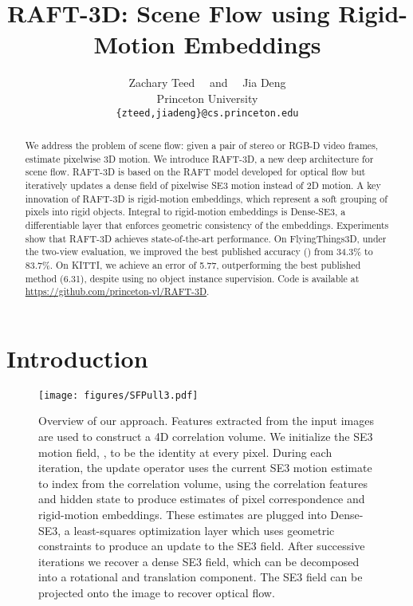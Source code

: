 \documentclass[final]{cvpr}
\begin{document}
\title{RAFT-3D: Scene Flow using Rigid-Motion Embeddings}

\author{Zachary Teed \ \ and \ \ Jia Deng \\
Princeton University \\
{\tt\small \{zteed,jiadeng\}@cs.princeton.edu}}

\maketitle

\begin{abstract}
  We address the problem of scene flow: given a pair of stereo or RGB-D video frames, estimate pixelwise 3D motion. We introduce RAFT-3D, a new deep architecture for scene flow. RAFT-3D is based on the RAFT model developed for optical flow but iteratively updates a dense field of pixelwise SE3 motion instead of 2D motion. A key innovation of RAFT-3D is rigid-motion embeddings, which represent a soft grouping of pixels into rigid objects. Integral to rigid-motion embeddings is Dense-SE3, a differentiable layer that enforces geometric consistency of the embeddings. Experiments show that RAFT-3D achieves state-of-the-art performance. On FlyingThings3D, under the two-view evaluation, we improved the best published accuracy () from 34.3\% to 83.7\%. On KITTI, we achieve an error of 5.77, outperforming the best published method (6.31), despite using no object instance supervision. Code is available at \url{https://github.com/princeton-vl/RAFT-3D}.
  \end{abstract}


\section{Introduction}

\begin{figure*}
    \centering
    \texttt{[image: figures/SFPull3.pdf]}
    \caption{Overview of our approach. Features extracted from the input images are used to construct a 4D correlation volume. We initialize the SE3 motion field, , to be the identity at every pixel. During each iteration, the update operator uses the current SE3 motion estimate to index from the correlation volume, using the correlation features and hidden state to produce estimates of pixel correspondence and rigid-motion embeddings. These estimates are plugged into Dense-SE3, a least-squares optimization layer which uses geometric constraints to produce an update to the SE3 field. After successive iterations we recover a dense SE3 field, which can be decomposed into a rotational and translation component. The SE3 field can be projected onto the image to recover optical flow.}
    \label{fig:RAFT3D}
\end{figure*}
\end{document}

